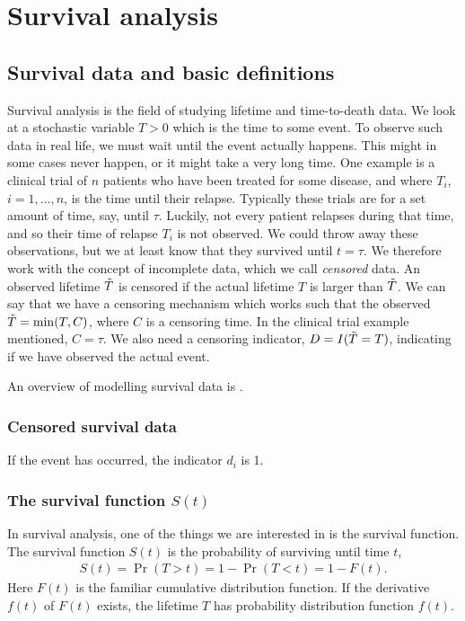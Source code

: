 \chapter{Survival analysis}

\section{Survival data and basic definitions}
Survival analysis is the field of studying lifetime and time-to-death data. We look at a stochastic variable $T>0$ which is the time to some event. To observe such data in real life, we must wait until the event actually happens. This might in some cases never happen, or it might take a very long time. One example is a clinical trial of $n$ patients who have been treated for some disease, and where $T_i$, $i=1,\ldots,n$, is the time until their relapse. Typically these trials are for a set amount of time, say, until $\tau$. Luckily, not every patient relapses during that time, and so their time of relapse $T_i$ is not observed. We could throw away these observations, but we at least know that they survived until $t=\tau$. We therefore work with the concept of incomplete data, which we call \textit{censored} data. An observed lifetime $\tilde{T}$ is censored if the actual lifetime $T$ is larger than $\tilde{T}$. We can say that we have a censoring mechanism which works such that the observed $\tilde{T}=\min(T, C)$, where $C$ is a censoring time. In the clinical trial example mentioned, $C=\tau$. We also need a censoring indicator, $D=I(\tilde{T}=T)$, indicating if we have observed the actual event.

An overview of modelling survival data is \citet{ABG}.

\subsection{Censored survival data}
If the event has occurred, the indicator $d_i$ is 1. 

\subsection{The survival function $S(t)$}
In survival analysis, one of the things we are interested in is the survival function. The survival function $S(t)$ is the probability of surviving until time $t$,
\begin{align*}
    S(t)=\Pr(T>t)=1-\Pr(T<t)=1-F(t).
\end{align*}
Here $F(t)$ is the familiar cumulative distribution function. If the derivative $f(t)$ of $F(t)$ exists, the lifetime $T$ has probability distribution function $f(t)$.

